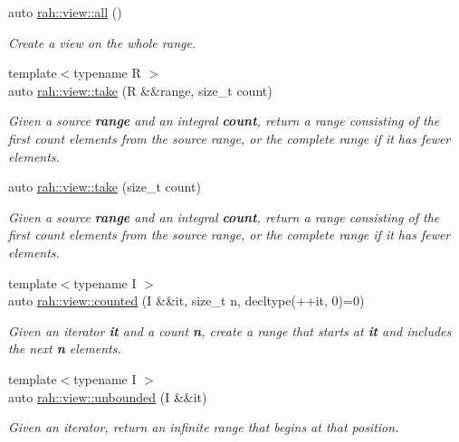 \begin{DoxyCompactItemize}
auto \mbox{\hyperlink{namespacerah_1_1view_aeed660f7f6a4e0fbefffa4e42de7642a}{rah\+::view\+::all}} ()
\begin{DoxyCompactList}\small\item\em Create a view on the whole range. \end{DoxyCompactList}\item 
{\footnotesize template$<$typename R $>$ }\\auto \mbox{\hyperlink{namespacerah_1_1view_abf061092d9ba17f35fb1ca63eed50d9a}{rah\+::view\+::take}} (R \&\&range, size\+\_\+t count)
\begin{DoxyCompactList}\small\item\em Given a source {\bfseries{range}} and an integral {\bfseries{count}}, return a range consisting of the first count elements from the source range, or the complete range if it has fewer elements. \end{DoxyCompactList}\item 
auto \mbox{\hyperlink{namespacerah_1_1view_ad0ee883cff948aff77ad05a26dad0f92}{rah\+::view\+::take}} (size\+\_\+t count)
\begin{DoxyCompactList}\small\item\em Given a source {\bfseries{range}} and an integral {\bfseries{count}}, return a range consisting of the first count elements from the source range, or the complete range if it has fewer elements. \end{DoxyCompactList}\item 
{\footnotesize template$<$typename I $>$ }\\auto \mbox{\hyperlink{namespacerah_1_1view_a9ea4acac3be1e0c4bf367c61a5252653}{rah\+::view\+::counted}} (I \&\&it, size\+\_\+t n, decltype(++it, 0)=0)
\begin{DoxyCompactList}\small\item\em Given an iterator {\bfseries{it}} and a count {\bfseries{n}}, create a range that starts at {\bfseries{it}} and includes the next {\bfseries{n}} elements. \end{DoxyCompactList}\item 
{\footnotesize template$<$typename I $>$ }\\auto \mbox{\hyperlink{namespacerah_1_1view_a4a484f6d91dbf5795a4c60693c560592}{rah\+::view\+::unbounded}} (I \&\&it)
\begin{DoxyCompactList}\small\item\em Given an iterator, return an infinite range that begins at that position. \end{DoxyCompactList}\item 

\end{DoxyCompactItemize}
